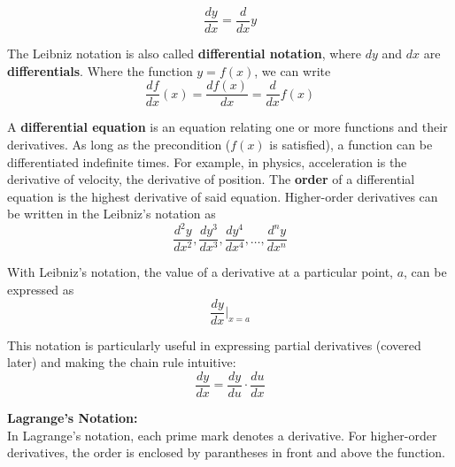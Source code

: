 \documentclass{article}
\begin{document}
            \begin{equation*}
                \frac{dy}{dx}=\frac{d}{dx}y
            \end{equation*}

            \noindent The Leibniz notation is also called \textbf{differential notation}, where
            $dy$ and $dx$ are \textbf{differentials}. Where the function $y=f(x)$, we can write \\

            \begin{equation*}
                \frac{df}{dx}(x)=\frac{df(x)}{dx}=\frac{d}{dx}f(x)
            \end{equation*}

            \noindent A \textbf{differential equation} is an equation relating one or more functions
            and their derivatives. As long as the precondition ($f(x)$ is satisfied), a function can
            be differentiated indefinite times. For example, in physics, acceleration is the
            derivative of velocity, the derivative of position. The \textbf{order} of a differential
            equation is the highest derivative of said equation. Higher-order derivatives can be
            written in the Leibniz's notation as \\

            \begin{equation*}
                \frac{d^2y}{dx^2}, \frac{dy^3}{dx^3}, \frac{dy^4}{dx^4},\dots,\frac{d^ny}{dx^n}
            \end{equation*}

            \noindent With Leibniz's notation, the value of a derivative at a particular point, $a$,
            can be expressed as \\

            \begin{equation*}
                \frac{dy}{dx}\Bigr|_{x=a}
            \end{equation*}

            \noindent This notation is particularly useful in expressing partial derivatives
            (covered later) and making the chain rule intuitive: \\

            \begin{equation*}
                \frac{dy}{dx} = \frac{dy}{du}\cdot\frac{du}{dx}
            \end{equation*}

            \noindent \color{purple} \textbf{Lagrange's Notation:} \color{black} \\
            In Lagrange's notation, each prime mark denotes a derivative. For higher-order derivatives,
            the order is enclosed by parantheses in front and above the function. \\
\end{document}
